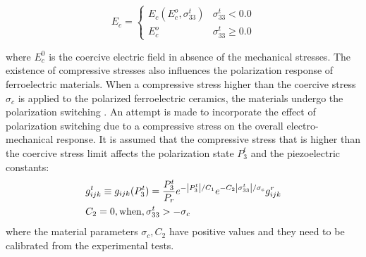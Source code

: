 \begin{equation}
    E_c=\begin{cases}
               E_c \left( E_c^o , \sigma _{33}^{t } \right)  & \sigma _{33}^{t } < 0.0 \\
               E_c^o                                                 & \sigma _{33}^{t } \ge 0.0 
\end{cases}
\label{EQN:Effect_of_tensile_stress}
\end{equation}
 
where $E^0_c$ is the coercive electric field in absence of the mechanical stresses.
The existence of compressive stresses also influences the polarization response of ferroelectric materials. 
When a compressive stress higher than the coercive stress $\sigma_c$ is applied to the polarized ferroelectric ceramics,
 the materials undergo the polarization switching \cite{Li2004959}. 
An attempt is made to incorporate the effect of polarization switching due to a compressive stress on the overall electro-mechanical response. 
It is assumed that the compressive stress that is higher than the coercive stress limit affects the polarization state $P^t_3$ and the piezoelectric constants:
\begin{equation}
\begin{aligned}
& g_{ijk}^t \equiv {g_{ijk}}(P_3^t) = \frac{{P_3^t}}{{{P_r}}}{e^{ - \left| {P_3^t} \right|/{C_1}}}{e^{ - {C_2}\left| {\sigma _{33}^t} \right|/{\sigma _c}}}g_{ijk}^r\\
& {C_2} = 0, {\rm{ when }}, \sigma _{33}^t >  - {\sigma _c}
\end{aligned}
\label{EQN:Effect_of_tensile_stress_on_piezo_constants}
\end{equation} 
where the material parameters $\sigma_c, C_2$ have positive values and they need to be calibrated from the experimental tests.

